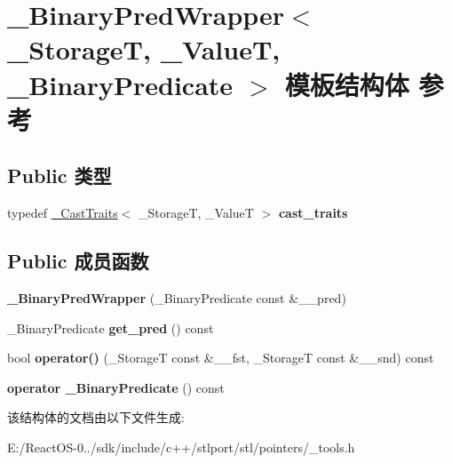 \hypertarget{struct___binary_pred_wrapper}{}\section{\+\_\+\+Binary\+Pred\+Wrapper$<$ \+\_\+\+StorageT, \+\_\+\+ValueT, \+\_\+\+Binary\+Predicate $>$ 模板结构体 参考}
\label{struct___binary_pred_wrapper}
\subsection*{Public 类型}
\begin{DoxyCompactItemize}
\item 
\mbox{\label{struct___binary_pred_wrapper_ad6ea55fd4b7cd82e348a7c37e613e183}} 
typedef \hyperlink{struct___cast_traits}{\+\_\+\+Cast\+Traits}$<$ \+\_\+\+StorageT, \+\_\+\+ValueT $>$ {\bfseries cast\+\_\+traits}
\end{DoxyCompactItemize}
\subsection*{Public 成员函数}
\begin{DoxyCompactItemize}
\item 
\mbox{\label{struct___binary_pred_wrapper_a652d2591ae263b3ef140b2ebb1a5d16f}} 
{\bfseries \+\_\+\+Binary\+Pred\+Wrapper} (\+\_\+\+Binary\+Predicate const \&\+\_\+\+\_\+pred)
\item 
\mbox{\label{struct___binary_pred_wrapper_ac4276b4c26128bf30f428c9c1ebd5f32}} 
\+\_\+\+Binary\+Predicate {\bfseries get\+\_\+pred} () const
\item 
\mbox{\label{struct___binary_pred_wrapper_a7ae1e5d8ecb17b22bc1db394f84211e3}} 
bool {\bfseries operator()} (\+\_\+\+StorageT const \&\+\_\+\+\_\+fst, \+\_\+\+StorageT const \&\+\_\+\+\_\+snd) const
\item 
\mbox{\label{struct___binary_pred_wrapper_a48abff051cfee18f562295bff43edd83}} 
{\bfseries operator \+\_\+\+Binary\+Predicate} () const
\end{DoxyCompactItemize}


该结构体的文档由以下文件生成\+:\begin{DoxyCompactItemize}
\item 
E\+:/\+React\+O\+S-\/0../sdk/include/c++/stlport/stl/pointers/\+\_\+tools.\+h\end{DoxyCompactItemize}
